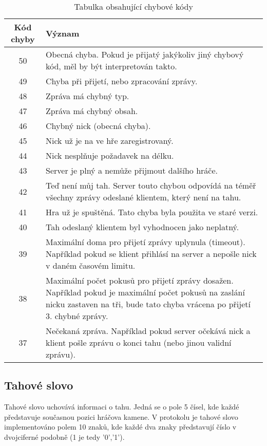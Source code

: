 \documentclass[11pt,a4paper]{scrartcl}
\begin{document}
\begin{center}
		\begin{longtable} {| c | p{12cm} | }
			\caption{Tabulka obsahující chybové kódy} \\
			
			\hline
			Kód chyby & Význam \\
			\hline
			\hline
			50 & Obecná chyba. Pokud je přijatý jakýkoliv jiný chybový kód, měl by být interpretován takto.\\
			\hline
			49 & Chyba při přijetí, nebo zpracování zprávy.\\
			\hline
			48 & Zpráva má chybný typ.\\
			\hline
			47 & Zpráva má chybný obsah. \\
			\hline
			46 & Chybný nick (obecná chyba).\\
			\hline
			45 & Nick už je na ve hře zaregistrovaný.\\
			\hline
			44 & Nick nesplňuje požadavek na délku.\\
			\hline
			43 & Server je plný a nemůže přijmout dalšího hráče.\\
			\hline
			42 & Teď není můj tah. Server touto chybou odpovídá na téměř všechny zprávy odeslané klientem, který není na tahu.\\
			\hline
			41 & Hra už je spuštěná. Tato chyba byla použita ve staré verzi.\\
			\hline
			40 & Tah odeslaný klientem byl vyhodnocen jako neplatný.\\
			\hline
			39 & Maximální doma pro přijetí zprávy uplynula (timeout). Například pokud se klient přihlásí na server a nepošle nick v daném časovém limitu.\\
			\hline
			38 & Maximální počet pokusů pro přijetí zprávy dosažen. Například pokud je maximální počet pokusů na zaslání nicku zastaven na tři, bude tato chyba vrácena po přijetí 3. chybné zprávy.\\
			\hline
			37 & Nečekaná zpráva. Například pokud server očekává nick a klient pošle zprávu o konci tahu (nebo jinou validní zprávu).\\
			\hline
		\end{longtable}
	\end{center}


	\subsection{Tahové slovo}
	Tahové slovo uchovává informaci o tahu. Jedná se o pole 5 čísel, kde každé představuje současnou pozici hráčova kamene. V protokolu je tahové slovo implementováno polem 10 znaků, kde každé dva znaky představují číslo v dvojciferné podobně (1 je tedy '0','1').
	
\end{document}

